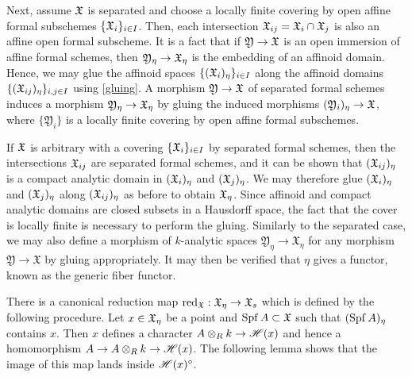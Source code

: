 Next, assume $\mathfrak{X}$ is separated and choose a locally finite covering by open affine formal subschemes $\{ \mathfrak{X}_{i} \}_{i \in I}$.
Then, each intersection $\mathfrak{X}_{ij} = \mathfrak{X}_i \cap \mathfrak{X}_j$ is also an affine open formal subscheme.
It is a fact that if $\mathfrak{Y} \to \mathfrak{X}$ is an open immersion of affine formal schemes, then $\mathfrak{Y}_{\eta} \to \mathfrak{X}_\eta$ is the embedding of an affinoid domain.
Hence, we may glue the affinoid spaces $\{ (\mathfrak{X}_{i})_{\eta} \}_{i \in I}$ along the affinoid domains $\{ (\mathfrak{X}_{ij})_{\eta} \}_{i, j \in I}$ using \cref{gluing}.
A morphism $\mathfrak{Y} \to \mathfrak{X}$ of separated formal schemes induces a morphism $\mathfrak{Y}_{\eta} \to \mathfrak{X}_\eta$ by gluing the induced morphisms $(\mathfrak{Y}_i)_{\eta} \to \mathfrak{X}$, where $\{\mathfrak{Y}_i\}$ is a locally finite covering by open affine formal subschemes.

If $\mathfrak{X}$ is arbitrary with a covering $\{ \mathfrak{X}_i \}_{i \in I}$ by separated formal schemes, then the intersections $\mathfrak{X}_{ij}$ are separated formal schemes, and it can be shown that $(\mathfrak{X}_{ij})_{\eta}$ is a compact analytic domain in $(\mathfrak{X}_i)_{\eta}$ and $(\mathfrak{X}_j)_{\eta}$.
We may therefore glue $(\mathfrak{X}_i)_{\eta}$ and $(\mathfrak{X}_j)_{\eta}$ along $(\mathfrak{X}_{ij})_{\eta}$ as before to obtain $\mathfrak{X}_{\eta}$.
Since affinoid and compact analytic domains are closed subsets in a Hausdorff space, the fact that the cover is locally finite is necessary to perform the gluing.
Similarly to the separated case, we may also define a morphism of $k$-analytic spaces $\mathfrak{Y}_{\eta} \to \mathfrak{X}_{\eta}$ for any morphism $\mathfrak{Y} \to \mathfrak{X}$ by gluing appropriately.
It may then be verified that $\eta$ gives a functor, known as the generic fiber functor.

There is a canonical reduction map $\operatorname{red}_{\mathfrak{X}}: \mathfrak{X}_\eta \to \mathfrak{X}_s$ which is defined by the following procedure. 
Let $x \in \mathfrak{X}_\eta$ be a point and $\operatorname{Spf} A \subset \mathfrak{X}$ such that $(\operatorname{Spf} A)_\eta$ contains $x$.
Then $x$ defines a character $A \otimes_{R} k \to \mathscr{H}(x)$ and hence a homomorphism $A \to A \otimes_{R} k \to \mathscr{H}(x)$.
The following lemma shows that the image of this map lands inside $\mathscr{H}(x)^{\circ}$.

